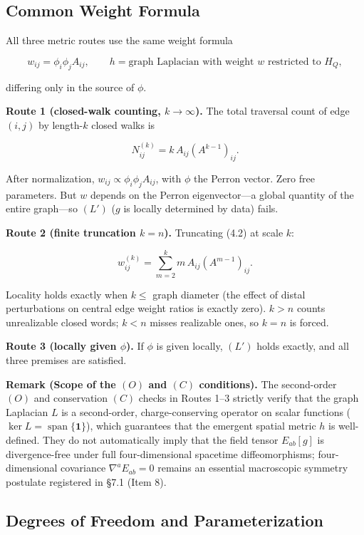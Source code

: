\documentclass[
  11pt,
]{article}
\begin{document}
\subsection{Common Weight Formula}\label{common-weight-formula}

All three metric routes use the same weight formula

\[
w_{ij}=\phi_i\phi_jA_{ij},
\qquad h=\text{graph Laplacian with weight }w\text{ restricted to }H_Q,
\tag{4.1}
\]

differing only in the source of \(\phi\).

\textbf{Route 1 (closed-walk counting, \(k\to\infty\)).} The total
traversal count of edge \((i,j)\) by length-\(k\) closed walks is

\[
N^{(k)}_{ij}=k\,A_{ij}(A^{k-1})_{ij}.
\tag{4.2}
\]

After normalization, \(w_{ij}\propto\phi_i\phi_jA_{ij}\), with \(\phi\)
the Perron vector. Zero free parameters. But \(w\) depends on the Perron
eigenvector---a global quantity of the entire graph---so \((L')\) (\(g\)
is locally determined by data) fails.

\textbf{Route 2 (finite truncation \(k=n\)).} Truncating (4.2) at scale
\(k\):

\[
w^{(k)}_{ij}=\sum_{m=2}^{k} m\,A_{ij}(A^{m-1})_{ij}.
\tag{4.3}
\]

Locality holds exactly when \(k\le\) graph diameter (the effect of
distal perturbations on central edge weight ratios is exactly zero).
\(k>n\) counts unrealizable closed words; \(k<n\) misses realizable
ones, so \(k=n\) is forced.

\textbf{Route 3 (locally given \(\phi\)).} If \(\phi\) is given locally,
\((L')\) holds exactly, and all three premises are satisfied.

\textbf{Remark (Scope of the \((O)\) and \((C)\) conditions).} The
second-order \((O)\) and conservation \((C)\) checks in Routes 1--3
strictly verify that the graph Laplacian \(L\) is a second-order,
charge-conserving operator on scalar functions
(\(\ker L = \operatorname{span}\{\mathbf{1}\}\)), which guarantees that
the emergent spatial metric \(h\) is well-defined. They do not
automatically imply that the field tensor \(E_{ab}[g]\) is
divergence-free under full four-dimensional spacetime diffeomorphisms;
four-dimensional covariance \(\nabla^a E_{ab}=0\) remains an essential
macroscopic symmetry postulate registered in §7.1 (Item 8).

\subsection{Degrees of Freedom and
Parameterization}\label{degrees-of-freedom-and-parameterization}
\end{document}
